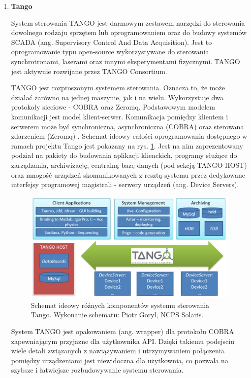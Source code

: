 \begin{enumerate}
	\item \textbf{Tango}
	
	\hspace{2em}System sterowania TANGO jest darmowym zestawem narzędzi do sterowania dowolnego rodzaju sprzętem lub oprogramowaniem oraz do budowy systemów SCADA (ang. Supervisory Control And Data Acquisition). Jest to oprogramowanie typu open-source wykorzystywane do sterowania synchrotronami, laserami oraz innymi eksperymentami fizycznymi. TANGO jest aktywnie rozwijane przez TANGO Consortium.
	
	\hspace{2em}TANGO jest rozproszonym systemem sterowania. Oznacza to, że może działać zarówno na jednej maszynie, jak i na wielu. Wykorzystuje dwa protokoły sieciowe - COBRA oraz Zeromq. Podstawowym modelem komunikacji jest model klient-serwer. Komunikacja pomiędzy klientem i serwerem może być synchroniczna, asynchroniczna (COBRA) oraz sterowana zdarzeniem (Zeromq) \cite{TangoWiki}. Schemat ideowy całości oprogramowania dostępnego w ramach projektu Tango jest pokazany na rys. \ref{fig:tango-outline}. Jest na nim zaprezentowany podział na pakiety do budowania aplikacji klienckich, programy służące do zarządzania, archiwizację, centralną bazę danych (pod sekcją TANGO HOST) oraz mnogość urządzeń skomunikowanych z resztą systemu przez dedykowane interfejsy programowej magistrali - serwery urządzeń (ang. Device Servers).
	
	\begin{figure}[hpt]
		\centering
		\includegraphics[width=1\linewidth]{Grafika/tango_outline}
		\caption{Schemat ideowy różnych komponentów systemu sterowania Tango. Wykonanie schematu: Piotr Goryl, NCPS Solaris.}
		\label{fig:tango-outline}
	\end{figure}
	
	\hspace{2em}System TANGO jest opakowaniem (ang. wrapper) dla protokołu COBRA zapewniającym przyjazne dla użytkownika API. Dzięki takiemu podejsciu wiele detali związanych z nawiązywaniem i utrzymywaniem połączenia pomiędzy urządzeniami jest niewidoczna dla użytkownia, co pozwala na szybsze i łatwiejsze rozbudowywanie systemu sterowania.
	

\end{enumerate}
